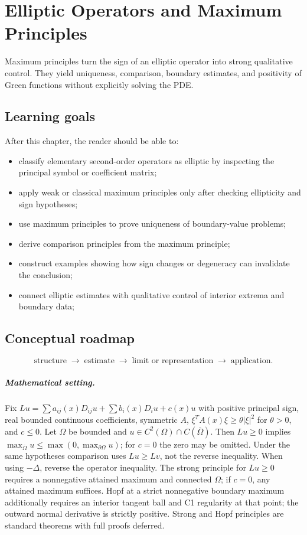 \chapter{Elliptic Operators and Maximum Principles}
\label{ch:iii27}

Maximum principles turn the sign of an elliptic operator into strong qualitative control. They yield uniqueness, comparison, boundary estimates, and positivity of Green functions without explicitly solving the PDE.

\section*{Learning goals}
After this chapter, the reader should be able to:
\begin{itemize}
\item classify elementary second-order operators as elliptic by inspecting the principal symbol or coefficient matrix;
\item apply weak or classical maximum principles only after checking ellipticity and sign hypotheses;
\item use maximum principles to prove uniqueness of boundary-value problems;
\item derive comparison principles from the maximum principle;
\item construct examples showing how sign changes or degeneracy can invalidate the conclusion;
\item connect elliptic estimates with qualitative control of interior extrema and boundary data;
\end{itemize}
\section*{Conceptual roadmap}
\[
\boxed{\text{structure}\;\longrightarrow\;\text{estimate}\;\longrightarrow\;\text{limit or representation}\;\longrightarrow\;\text{application}.}
\]

\paragraph{Mathematical setting.}
Fix $Lu=\sum a_{ij}(x)D_{ij}u+\sum b_i(x)D_iu+c(x)u$ with positive principal sign, real bounded continuous coefficients, symmetric $A$, $\xi^TA(x)\xi\ge\theta|\xi|^2$ for $\theta>0$, and $c\le0$. Let $\Omega$ be bounded and $u\in C^2(\Omega)\cap C(\overline\Omega)$. Then $Lu\ge0$ implies $\max_{\overline\Omega}u\le\max(0,\max_{\partial\Omega}u)$; for $c=0$ the zero may be omitted. Under the same hypotheses comparison uses $Lu\ge Lv$, not the reverse inequality. When using $-\Delta$, reverse the operator inequality. The strong principle for $Lu\ge0$ requires a nonnegative attained maximum and connected $\Omega$; if $c=0$, any attained maximum suffices. Hopf at a strict nonnegative boundary maximum additionally requires an interior tangent ball and C1 regularity at that point; the outward normal derivative is strictly positive. Strong and Hopf principles are standard theorems with full proofs deferred.

